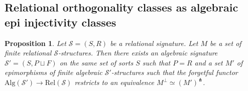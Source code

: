 \documentclass[a4paper]{article}
\newtheorem{proposition}[theorem]{Proposition}
\theoremstyle{remark}
\theoremstyle{definition}
\begin{document}
\subsection{Relational orthogonality classes as algebraic epi injectivity classes}

\begin{proposition}
  Let $\mathcal{S} = (S, R)$ be a relational signature.
  Let $M$ be a set of finite relational $\mathcal{S}$-structures.
  Then there exists an algebraic signature $\mathcal{S}' = (S, P \sqcup F)$ on the same set of sorts $S$ such that $P = R$ and a set $M'$ of epimorphisms of finite algebraic $\mathcal{S}'$-structures such that the forgetful functor $\mathrm{Alg}(\mathcal{S}') \rightarrow \mathrm{Rel}(\mathcal{S})$ restricts to an equivalence $M^\perp \simeq (M')^\pitchfork$.
\end{proposition}
\end{document}
